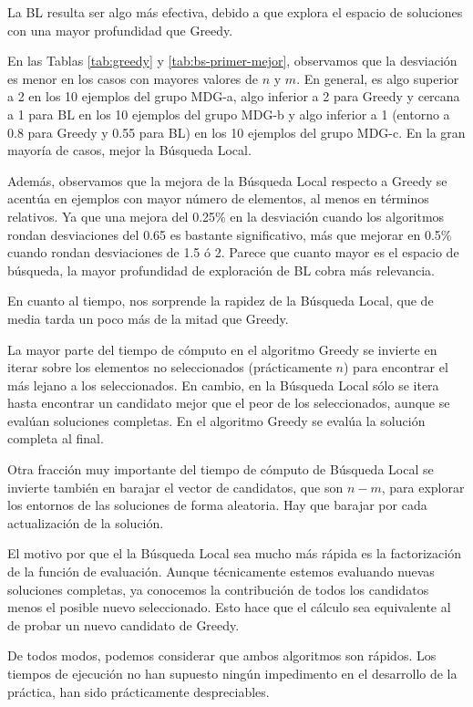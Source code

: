 \documentclass{article}
\begin{document}
 La BL resulta ser algo más efectiva, debido a que explora el espacio de soluciones con una mayor profundidad que Greedy.
 
 En las Tablas \ref{tab:greedy} y \ref{tab:bs-primer-mejor}, observamos que la desviación es menor en los casos con mayores 
 valores de $n$ y $m$. En general, es algo superior a 2 en los 10 ejemplos del grupo MDG-a, algo inferior a 2 para Greedy y
 cercana a 1 para BL en los 10 ejemplos del grupo MDG-b y algo inferior a 1 (entorno a 0.8 para Greedy y 0.55 para BL) en los 10
  ejemplos del grupo MDG-c. En la gran mayoría de casos, mejor la Búsqueda Local.
  
  Además, observamos que la mejora de la Búsqueda Local respecto a Greedy se acentúa en ejemplos con mayor número de elementos,
  al menos en términos
  relativos. Ya que una mejora del 0.25\% en la desviación cuando los algoritmos rondan desviaciones del 0.65 es bastante
   significativo, más que mejorar en 0.5\% cuando rondan desviaciones de 1.5 ó 2. Parece que cuanto mayor es el espacio de
   búsqueda, la mayor profundidad de exploración de BL cobra más relevancia.
   
  En cuanto al tiempo, nos sorprende la rapidez de la Búsqueda Local, que de media tarda un poco más de la mitad que Greedy.
  
  La mayor parte del tiempo de cómputo en el algoritmo Greedy se invierte en iterar sobre los elementos no seleccionados
   (prácticamente $n$) para encontrar el más lejano a los seleccionados. En cambio, en la Búsqueda Local sólo se itera hasta
   encontrar un candidato mejor que el peor de los seleccionados, aunque se evalúan soluciones completas.
   En el algoritmo Greedy se evalúa la solución completa al final.
   
   Otra fracción muy importante del tiempo de cómputo de Búsqueda Local se invierte también en barajar el vector de candidatos,
   que son $n-m$, para explorar los entornos de las soluciones de forma aleatoria. Hay que barajar por cada actualización de la
   solución.
   
   El motivo por que el la Búsqueda Local sea mucho más rápida es la factorización de la función de evaluación. Aunque técnicamente
   estemos evaluando nuevas soluciones completas, ya conocemos la contribución de todos los candidatos menos el posible nuevo
   seleccionado. Esto hace que el cálculo sea equivalente al de probar un nuevo candidato de Greedy.
   
   De todos modos, podemos considerar que ambos algoritmos son rápidos. Los tiempos de ejecución no han supuesto ningún impedimento
   en el desarrollo de la práctica, han sido prácticamente despreciables.
   
\end{document}
